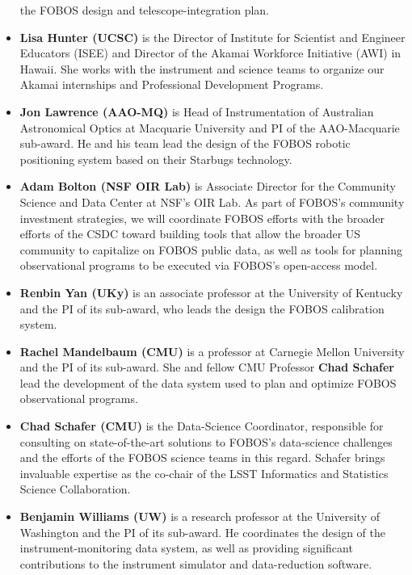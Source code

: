 \documentclass[oneside,11pt]{amsart}
\begin{document}
\begin{itemize}
the FOBOS design and telescope-integration plan.\\[-5pt]
%
\item {\bf Lisa Hunter (UCSC)} is the Director of Institute for
Scientist and Engineer Educators (ISEE) and Director of the Akamai
Workforce Initiative (AWI) in Hawaii. She works with the instrument and
science teams to organize our Akamai internships and Professional
Development Programs.\\[-5pt]
%
\item {\bf Jon Lawrence (AAO-MQ)} is Head of Instrumentation of
Australian Astronomical Optics at Macquarie University and PI of the
AAO-Macquarie sub-award.  He and his team lead the design of the FOBOS
robotic positioning system based on their Starbugs technology.\\[-5pt]
%
\item {\bf Adam Bolton (NSF OIR Lab)} is Associate Director for the
Community Science and Data Center at NSF's OIR Lab.  As part of FOBOS's
community investment strategies, we will coordinate FOBOS efforts with
the broader efforts of the CSDC toward building tools that allow the
broader US community to capitalize on FOBOS public data, as well as
tools for planning observational programs to be executed via FOBOS's
open-access model.\\[-5pt]
%
\item {\bf Renbin Yan (UKy)} is an associate professor at the University
of Kentucky and the PI of its sub-award, who leads the design the FOBOS
calibration system.\\[-5pt]
%
\item {\bf Rachel Mandelbaum (CMU)} is a professor at Carnegie Mellon
University and the PI of its sub-award. She and fellow CMU Professor
{\bf Chad Schafer} lead the development of the data system used to plan
and optimize FOBOS observational programs.\\[-5pt]
%
\item {\bf Chad Schafer (CMU)} is the Data-Science Coordinator,
responsible for consulting on state-of-the-art solutions to FOBOS’s
data-science challenges and the efforts of the FOBOS science teams in
this regard. Schafer brings invaluable expertise as the co-chair of the
LSST Informatics and Statistics Science Collaboration.\\[-5pt]
%
\item {\bf Benjamin Williams (UW)} is a research professor at the
University of Washington and the PI of its sub-award. He coordinates the
design of the instrument-monitoring data system, as well as providing
significant contributions to the instrument simulator and data-reduction
software.
%
\end{itemize}
\end{document}

